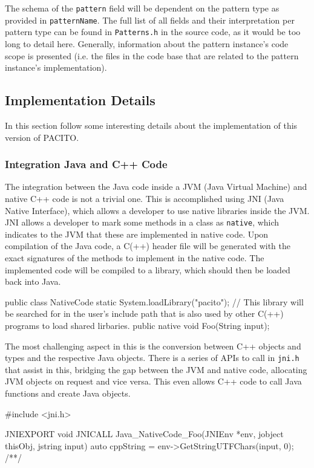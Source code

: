 The schema of the {\tt pattern} field will be dependent on the pattern type as provided in {\tt patternName}. The full list of all fields and their interpretation per pattern type can be found in {\tt Patterns.h} in the source code, as it would be too long to detail here. Generally, information about the pattern instance's code scope is presented (i.e. the  files in the code base that are related to the pattern instance's implementation).

\subsection{Implementation Details}
In this section follow some interesting details about the implementation of this version of PACITO.

\subsubsection{Integration Java and C++ Code}
The integration between the Java code inside a JVM (Java Virtual Machine) and native C++ code is not a trivial one. This is accomplished using JNI (Java Native Interface), which allows a developer to use native libraries inside the JVM. JNI allows a developer to mark some methods in a class as {\tt native}, which indicates to the JVM that these are implemented in native code. Upon compilation of the Java code, a C(++) header file will be generated with the exact signatures of the methods to implement in the native code. The implemented code will be compiled to a library, which should then be loaded back into Java.

\begin{javalong}
public class NativeCode {
    static {
        System.loadLibrary("pacito"); // This library will be searched for in the user's include path that is also used by other C(++) programs to load shared lirbaries.
    }
    public native void Foo(String input);
}
\end{javalong}

The most challenging aspect in this is the conversion between C++ objects and types and the respective Java objects. There is a series of APIs to call in {\tt jni.h} that assist in this, bridging the gap between the JVM and native code, allocating JVM objects on request and vice versa. This even allows C++ code to call Java functions and create Java objects.

\begin{cpplong}
#include <jni.h>

JNIEXPORT void JNICALL Java_NativeCode_Foo(JNIEnv *env, jobject thisObj, jstring input) {
    auto cppString = env->GetStringUTFChars(input, 0);
    /**/
}
\end{cpplong}

